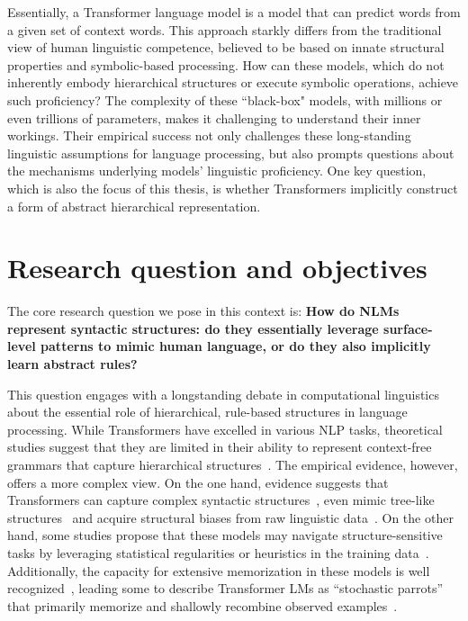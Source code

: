 Essentially, a Transformer language model is a model that can predict words from a given set of context words. This approach starkly differs from the traditional view of human linguistic competence, believed to be based on innate structural properties and symbolic-based processing. How can these models, which do not inherently embody hierarchical structures or execute symbolic operations, achieve such proficiency? The complexity of these ``black-box" models, with millions or even trillions of parameters, makes it challenging to understand their inner workings. Their empirical success not only challenges these long-standing linguistic assumptions for language processing, but also prompts questions about the mechanisms underlying models' linguistic proficiency. One key question, which is also the focus of this thesis, is whether Transformers implicitly construct a form of abstract hierarchical representation. 

\section{Research question and objectives} \label{sec:research_Q}

The core research question we pose in this context is: \textbf{How do \ac{NLMs} represent syntactic structures: do they essentially leverage surface-level patterns to mimic human language, or do they also implicitly learn abstract rules?} 


This question engages with a longstanding debate in computational linguistics about the essential role of hierarchical, rule-based structures in language processing. While Transformers have excelled in various NLP tasks, theoretical studies suggest that they are limited in their ability to represent context-free grammars that capture hierarchical structures~\citep{bhattamishra-etal-2020-ability,hahn:2020}. The empirical evidence, however, offers a more complex view. On the one hand, evidence suggests that Transformers can capture complex syntactic structures~\citep{goldberg19assessing,wolf2019some}, even mimic tree-like structures~\citep{jawahar-etal-2019-bert} and acquire structural biases from raw linguistic data~\citep{warstadt2020can}. On the other hand, some studies propose that these models may navigate structure-sensitive tasks by leveraging statistical regularities or heuristics in the training data~\citep{wei-etal-2021-frequency,sinha-etal-2021-masked,mccoy-etal-2019-right,da-costa-chaves-2020-assessing}. Additionally, the capacity for extensive memorization in these models is well recognized~\citep{halevy2009unreasonable,zhang2021understanding}, leading some to describe Transformer \ac{LMs} as ``stochastic parrots'' that primarily memorize and shallowly recombine observed examples~\citep{bender2021dangers}. 



